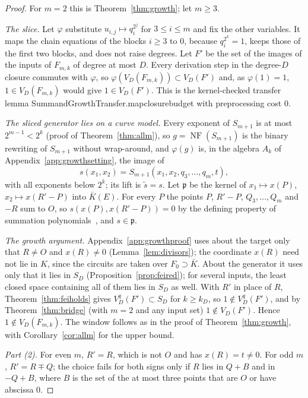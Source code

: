 \documentclass[11pt]{article}
\theoremstyle{definition}\newtheorem{definition}[theorem]{Definition}
\theoremstyle{remark}\newtheorem{remark}[theorem]{Remark}
\newcommand{\NF}{\operatorname{NF}}
\newcommand{\codeus}{\textunderscore\allowbreak}
\newcommand{\code}[1]{{\ttfamily\let\_\codeus#1}}
\begin{document}
\begin{proof}
For $m=2$ this is Theorem~\ref{thm:growth}; let $m\ge3$.

\emph{The slice.} Let $\varphi$ substitute $u_{i,j}\mapsto q_i^{2^j}$ for
$3\le i\le m$ and fix the other variables. It maps the chain equations of
the blocks $i\ge3$ to $0$, because $q_i^{2^k}=1$, keeps those of the first
two blocks, and does not raise degrees. Let $F'$ be the set of the images
of the inputs of $F_{m,k}$ of degree at most $D$. Every derivation step in
the degree-$D$ closure commutes with $\varphi$, so
$\varphi(V_D(F_{m,k}))\subset V_D(F')$ and, as $\varphi(1)=1$, $1\in
V_D(F_{m,k})$ would give $1\in V_D(F')$. This is the kernel-checked
transfer lemma \code{SummandGrowthTransfer.map\_closure\_budget} with
preprocessing cost $0$.

\emph{The sliced generator lies on a curve model.} Every exponent of
$S_{m+1}$ is at most $2^{m-1}<2^k$ (proof of Theorem~\ref{thm:allm}), so
$g=\NF(S_{m+1})$ is the binary rewriting of $S_{m+1}$ without
wrap-around, and $\varphi(g)$ is, in the algebra $A_k$ of
Appendix~\ref{app:growthsetting}, the image of
\[
 s(x_1,x_2)=S_{m+1}(x_1,x_2,q_3,\ldots,q_m,t),
\]
with all exponents below $2^k$; its lift is $\tilde s=s$. Let $\mathfrak
p$ be the kernel of $x_1\mapsto x(P)$, $x_2\mapsto x(R'-P)$ into
$\bar K(E)$. For every $P$ the points $P$, $R'-P$, $Q_3,\ldots,Q_m$ and
$-R$ sum to $O$, so $s(x(P),x(R'-P))=0$ by the defining property of
summation polynomials~\cite{semaev}, and $s\in\mathfrak p$.

\emph{The growth argument.} Appendix~\ref{app:growthproof} uses about the
target only that $R\ne O$ and $x(R)\ne0$ (Lemma~\ref{lem:divisors}); the
coordinate $x(R)$ need not lie in $K$, since the circuits are taken over
$F_0\supset\bar K$. About the generator it uses only that it lies in $S_D$
(Proposition~\ref{prop:feired}); for several inputs, the least closed space
containing all of them lies in $S_D$ as well. With $R'$ in place of $R$,
Theorem~\ref{thm:feiholds} gives $V^q_D(F')\subset S_D$ for $k\ge k_D$, so
$1\notin V^q_D(F')$, and by Theorem~\ref{thm:bridge} (with $m=2$ and any
input set) $1\notin V_D(F')$. Hence $1\notin V_D(F_{m,k})$. The window
follows as in the proof of Theorem~\ref{thm:growth}, with
Corollary~\ref{cor:allm} for the upper bound.

\emph{Part (2).} For even $m$, $R'=R$, which is not $O$ and has $x(R)=t\ne0$.
For odd $m$, $R'=R\mp Q$; the choice fails for both signs only if $R$ lies
in $Q+B$ and in $-Q+B$, where $B$ is the set of the at most three points
that are $O$ or have abscissa $0$.


\end{proof}
\end{document}
